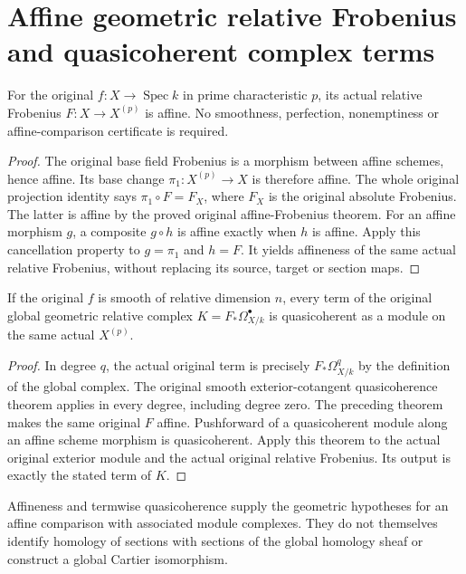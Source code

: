 \section{Affine geometric relative Frobenius and quasicoherent complex terms}

\begin{theorem}
\label{thm:cartier-geometric-relative-frobenius-affine}
\leanok
{}
For the original $f:X\to\operatorname{Spec}k$ in prime characteristic
$p$, its actual relative Frobenius $F:X\to X^{(p)}$ is affine.
No smoothness, perfection, nonemptiness or affine-comparison
certificate is required.
\end{theorem}
\begin{proof}
The original base field Frobenius is a morphism between affine
schemes, hence affine. Its base change $\pi_1:X^{(p)}\to X$ is
therefore affine. The whole original projection identity says
$\pi_1\circ F=F_X$, where $F_X$ is the original absolute Frobenius.
The latter is affine by the proved original affine-Frobenius theorem.
For an affine morphism $g$, a composite $g\circ h$ is affine exactly
when $h$ is affine. Apply this cancellation property to $g=\pi_1$
and $h=F$. It yields affineness of the same actual relative
Frobenius, without replacing its source, target or section maps.
\end{proof}

\begin{theorem}
\label{thm:cartier-geometric-relative-complex-quasicoherent}
\leanok
{}
If the original $f$ is smooth of relative dimension $n$, every term
of the original global geometric relative complex
$K=F_*\Omega^\bullet_{X/k}$ is quasicoherent as a module on the
same actual $X^{(p)}$.
\end{theorem}
\begin{proof}
In degree $q$, the actual original term is precisely
$F_*\Omega^q_{X/k}$ by the definition of the global complex.
The original smooth exterior-cotangent quasicoherence theorem applies
in every degree, including degree zero. The preceding theorem makes
the same original $F$ affine. Pushforward of a quasicoherent module
along an affine scheme morphism is quasicoherent. Apply this theorem
to the actual original exterior module and the actual original
relative Frobenius. Its output is exactly the stated term of $K$.
\end{proof}

Affineness and termwise quasicoherence supply the geometric hypotheses
for an affine comparison with associated module complexes. They do
not themselves identify homology of sections with sections of the
global homology sheaf or construct a global Cartier isomorphism.
